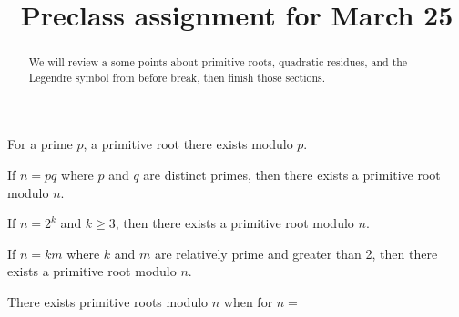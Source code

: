 \documentclass{ximera}
\title{Preclass assignment for March 25}
\theoremstyle{plain}
\begin{document}
  
\begin{abstract}  
We will review a some points about primitive roots, quadratic residues, and the Legendre symbol from before break, then finish those sections.
\end{abstract}  
\maketitle  

\begin{question}
For a prime $p$, a primitive root there exists modulo $p$.
\begin{multipleChoice}
\end{multipleChoice}
\end{question}

\begin{question}
 If $n=pq$ where $p$ and $q$ are distinct primes, then there exists a primitive root modulo $n$.
 \begin{multipleChoice}
\end{multipleChoice}
\end{question}

\begin{question}
 If $n=2^k$ and $k\geq 3$, then there exists a primitive root modulo $n$.
 \begin{multipleChoice}
\end{multipleChoice}
\end{question}

\begin{question}
 If $n=km$ where $k$ and $m$ are relatively prime and greater than 2, then there exists a primitive root modulo $n$.
 \begin{multipleChoice}
\end{multipleChoice}
\end{question}

\begin{question}
There exists primitive roots modulo $n$ when for $n=$
 \begin{selectAll}
\end{selectAll}
\end{question}
\end{document}
